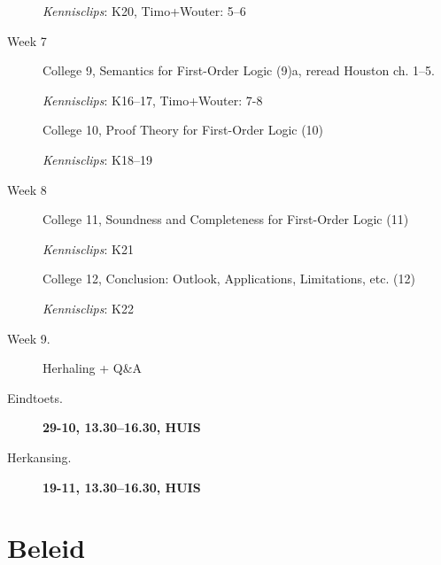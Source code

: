 \documentclass[a4paper,11pt]{article}
\begin{document}
\begin{description}
    \emph{Kennisclips}: K20, Timo+Wouter: 5--6

  \item[Week 7]
    College 9, Semantics for First-Order Logic (9)a, reread Houston ch. 1--5.

    \emph{Kennisclips}: K16--17, Timo+Wouter: 7-8

  \item[\phantom{Week 6}]
    College 10, Proof Theory for First-Order Logic (10)

    \emph{Kennisclips}: K18--19

  \item[Week 8]
    College 11, Soundness and Completeness for First-Order Logic (11)

    \emph{Kennisclips}: K21

  \item[\phantom{Week 6}]
    College 12, Conclusion: Outlook, Applications, Limitations, etc. (12)

    \emph{Kennisclips}: K22

  \item[Week 9.]
    Herhaling + Q\&A

  \item[Eindtoets.]
    {\bf 29-10, 13.30--16.30, HUIS}

  \item[Herkansing.]
    {\bf 19-11, 13.30--16.30, HUIS}

\end{description}

\section*{Beleid}
\end{document}
